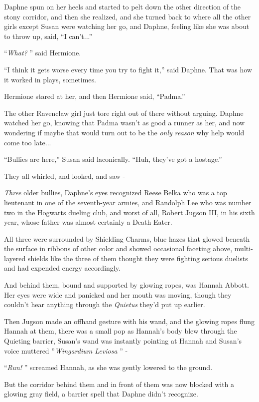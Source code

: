 Daphne spun on her heels and started to pelt down the other direction of
the stony corridor, and then she realized, and she turned back to where
all the other girls except Susan were watching her go, and Daphne,
feeling like she was about to throw up, said, ``I can't...''

``\emph{What?} '' said Hermione.

``I think it gets worse every time you try to fight it,'' said Daphne.
That was how it worked in plays, sometimes.

Hermione stared at her, and then Hermione said, ``Padma.''

The other Ravenclaw girl just tore right out of there without arguing.
Daphne watched her go, knowing that Padma wasn't as good a runner as
her, and now wondering if maybe that would turn out to be the \emph{only
reason} why help would come too late...

``Bullies are here,'' Susan said laconically. ``Huh, they've got a
hostage.''

They all whirled, and looked, and saw -

\emph{Three} older bullies, Daphne's eyes recognized Reese Belka who was
a top lieutenant in one of the seventh-year armies, and Randolph Lee who
was number two in the Hogwarts dueling club, and worst of all, Robert
Jugson III, in his sixth year, whose father was almost certainly a Death
Eater.

All three were surrounded by Shielding Charms, blue hazes that glowed
beneath the surface in ribbons of other color and showed occasional
faceting above, multi-layered shields like the three of them thought
they were fighting serious duelists and had expended energy accordingly.

And behind them, bound and supported by glowing ropes, was Hannah
Abbott. Her eyes were wide and panicked and her mouth was moving, though
they couldn't hear anything through the \emph{Quietus} they'd put up
earlier.

Then Jugson made an offhand gesture with his wand, and the glowing ropes
flung Hannah at them, there was a small pop as Hannah's body blew
through the Quieting barrier, Susan's wand was instantly pointing at
Hannah and Susan's voice muttered ''\emph{Wingardium Leviosa} '' -

``\emph{Run!} '' screamed Hannah, as she was gently lowered to the ground.

But the corridor behind them and in front of them was now blocked with a
glowing gray field, a barrier spell that Daphne didn't recognize.

